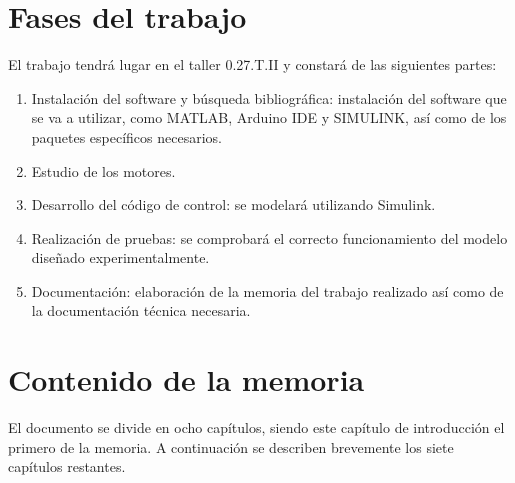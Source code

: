 \section{Fases del trabajo}

El trabajo tendrá lugar en el taller 0.27.T.II y constará de las siguientes partes:

\begin{enumerate}
    \item Instalación del software y búsqueda bibliográfica: instalación del software que se va a utilizar, como MATLAB, Arduino IDE y SIMULINK, así como de los paquetes específicos necesarios.
    \item Estudio de los motores.
    \item Desarrollo del código de control: se modelará utilizando Simulink.
    \item Realización de pruebas: se comprobará el correcto funcionamiento del modelo diseñado experimentalmente.
    \item Documentación: elaboración de la memoria del trabajo realizado así como de la documentación técnica necesaria.
\end{enumerate}


\section{Contenido de la memoria}

El documento se divide en ocho capítulos, siendo este capítulo de introducción el primero de la memoria. A continuación se describen brevemente los siete capítulos restantes.

